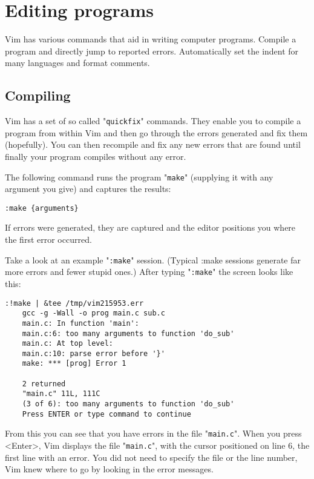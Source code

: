 \section{Editing programs}
Vim has various commands that aid in writing computer programs.
Compile a program and directly jump to reported errors.
Automatically set the indent for many languages and format comments.
\subsection{Compiling}
Vim has a set of so called "\verb!quickfix!" commands.
They enable you to compile a program from within Vim and then go through the errors generated and fix them (hopefully).
You can then recompile and fix any new errors that are found until finally your program compiles without any error.

The following command runs the program "\verb!make!" (supplying it with any argument you give) and captures the results:

\begin{Verbatim}[samepage=true]
 :make {arguments}
\end{Verbatim}

If errors were generated, they are captured and the editor positions you where the first error occurred.

Take a look at an example "\verb!:make!" session.
(Typical :make sessions generate far more errors and fewer stupid ones.)  After typing "\verb!:make!" the screen looks like this:

\begin{Verbatim}[samepage=true]
    :!make | &tee /tmp/vim215953.err 
    gcc -g -Wall -o prog main.c sub.c 
    main.c: In function 'main': 
    main.c:6: too many arguments to function 'do_sub' 
    main.c: At top level: 
    main.c:10: parse error before '}' 
    make: *** [prog] Error 1 

    2 returned 
    "main.c" 11L, 111C 
    (3 of 6): too many arguments to function 'do_sub' 
    Press ENTER or type command to continue 
\end{Verbatim}

From this you can see that you have errors in the file "\verb!main.c!".
When you press <Enter>, Vim displays the file "\verb!main.c!", with the cursor positioned on line 6, the first line with an error.
You did not need to specify the file or the line number, Vim knew where to go by looking in the error messages.

